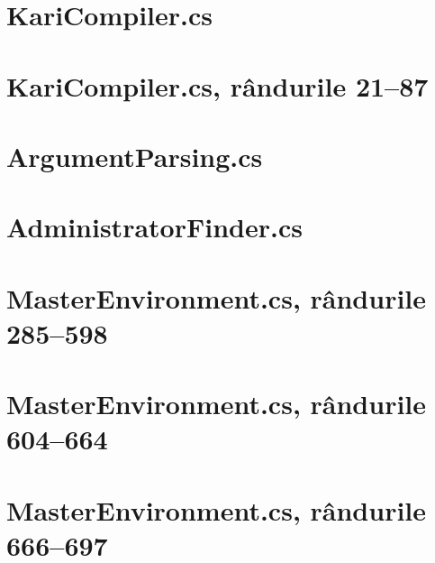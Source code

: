 \documentclass[a4paper,12pt]{report}
\begin{document}




\appendix
\chapter{KariCompiler.cs}\label{appendix:Kari____Kari_source_Kari_Generator_KariCompiler}


\chapter{KariCompiler.cs, rândurile 21--87}\label{appendix:Kari____Kari_source_Kari_Generator_KariCompiler_21_87}


\chapter{ArgumentParsing.cs}\label{appendix:Kari____Kari_source_Kari_Arguments_ArgumentParsing}


\chapter{AdministratorFinder.cs}\label{appendix:Kari____Kari_source_Kari_GeneratorCore_Workflow_AdministratorFinder}


\chapter{MasterEnvironment.cs, rândurile 285--598}\label{appendix:Kari____Kari_source_Kari_GeneratorCore_Workflow_MasterEnvironment_285_598}


\chapter{MasterEnvironment.cs, rândurile 604--664}\label{appendix:Kari____Kari_source_Kari_GeneratorCore_Workflow_MasterEnvironment_604_664}


\chapter{MasterEnvironment.cs, rândurile 666--697}\label{appendix:Kari____Kari_source_Kari_GeneratorCore_Workflow_MasterEnvironment_666_697}

\end{document}
